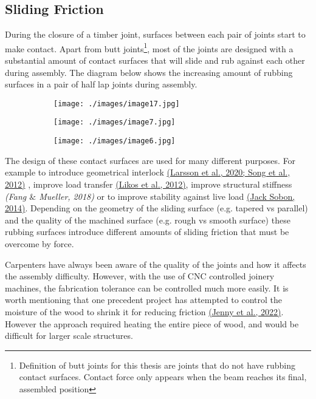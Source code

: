 \subsection{Sliding Friction}

During the closure of a timber joint, surfaces between each pair of joints start to make contact. Apart from butt joints\footnote{ Definition of butt joints for this thesis are joints that do not have rubbing contact surfaces. Contact force only appears when the beam reaches its final, assembled position}, most of the joints are designed with a substantial amount of contact surfaces that will slide and rub against each other during assembly. The diagram below shows the increasing amount of rubbing surfaces in a pair of half lap joints during assembly. 

\begin{figure}[H]
\centering
\begin{subfigure}[b]{0.3\textwidth}
\centering
\texttt{[image: ./images/image17.jpg]}
\end{subfigure}
\hfill
\begin{subfigure}[b]{0.3\textwidth}
\centering
\texttt{[image: ./images/image7.jpg]}
\end{subfigure}
\hfill
\begin{subfigure}[b]{0.3\textwidth}
\centering
\texttt{[image: ./images/image6.jpg]}
\end{subfigure}
\end{figure}


\vspace{1\baselineskip}
The design of these contact surfaces are used for many different purposes. For example to introduce geometrical interlock \href{https://www.zotero.org/google-docs/?FoyCyy}{(Larsson et al., 2020; Song et al., 2012)}\textit{ }, improve load transfer \href{https://www.zotero.org/google-docs/?uGwPtv}{(Likos et al., 2012)}, improve structural stiffness\textit{ \href{https://www.zotero.org/google-docs/?vLOXsl}{}(Fang $\&$ Mueller, 2018)} or to improve stability against live load \href{https://www.zotero.org/google-docs/?PPcjqg}{(Jack Sobon, 2014)}. Depending on the geometry of the sliding surface (e.g. tapered vs parallel) and the quality of the machined surface (e.g. rough vs smooth surface) these rubbing surfaces introduce different amounts of sliding friction that must be overcome by force.

Carpenters have always been aware of the quality of the joints and how it affects the assembly difficulty. However, with the use of CNC controlled joinery machines, the fabrication tolerance can be controlled much more easily. It is worth mentioning that one precedent project has attempted to control the moisture of the wood to shrink it for reducing friction \href{https://www.zotero.org/google-docs/?Wr3WNi}{(Jenny et al., 2022)}. However the approach required heating the entire piece of wood, and would be difficult for larger scale structures.

